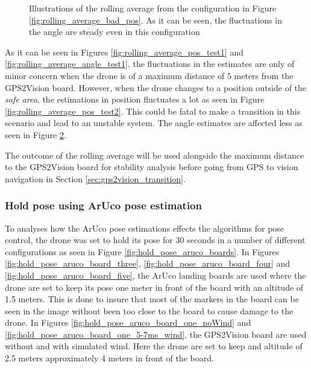 \documentclass[../Head/report.tex]{subfiles}
\begin{document}
\begin{figure}[H]
\begin{subfigure}[t]{.30\textwidth}
        \caption{}
        \label{fig:rolling_average_in_yaw_test2}
    \end{subfigure}
    \caption{Illustrations of the rolling average from the configuration in Figure \ref{fig:rolling_average_bad_pos}. As it can be seen, the fluctuations in the angle are steady even in this configuration}
    \label{fig:rolling_average_angle_test2}
\end{figure}

As it can be seen in Figures \ref{fig:rolling_average_pos_test1} and \ref{fig:rolling_average_angle_test1}, the fluctuations in the estimates are only of minor concern when the drone is of a maximum distance of 5 meters from the GPS2Vision board. However, when the drone changes to a position outside of the \textit{safe area}, the estimations in position fluctuates a lot as seen in Figure \ref{fig:rolling_average_pos_test2}. This could be fatal to make a transition in this scenario and lead to an unstable system. The angle estimates are affected less as seen in Figure \ref{fig:rolling_average_angle_test2}.

The outcome of the rolling average will be used alongside the maximum distance to the GPS2Vision board for stability analysis before going from GPS to vision navigation in Section \ref{sec:gps2vision_transition}.  

\subsubsection{Hold pose using ArUco pose estimation}
\label{sec:hold_pose_using_aruco_pose_estimation}

To analyses how the ArUco pose estimations effects the algorithms for pose control, the drone was set to hold its pose for 30 seconds in a number of different configurations as seen in Figure \ref{fig:hold_pose_aruco_boards}. In Figures \ref{fig:hold_pose_aruco_board_three}, \ref{fig:hold_pose_aruco_board_four} and \ref{fig:hold_pose_aruco_board_five}, the ArUco landing boards are used where the drone are set to keep its pose one meter in front of the board with an altitude of 1.5 meters. This is done to insure that most of the markers in the board can be seen in the image without been too close to the board to cause damage to the drone. In Figures \ref{fig:hold_pose_aruco_board_one_noWind} and \ref{fig:hold_pose_aruco_board_one_5-7ms_wind}, the GPS2Vision board are used without and with simulated wind. Here the drone are set to keep and altitude of 2.5 meters approximately 4 meters in front of the board.
\end{document}
